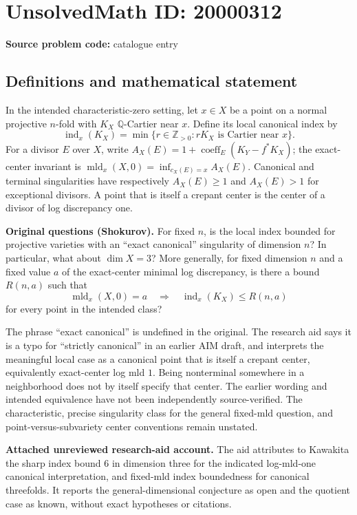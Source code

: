 \documentclass[11pt]{article}
\newcommand{\Z}{\mathbb{Z}}
\newcommand{\Q}{\mathbb{Q}}
\begin{document}
\section*{UnsolvedMath ID: 20000312}
\textbf{Source problem code:} catalogue entry
\subsection{Definitions and mathematical statement}
In the intended characteristic-zero setting, let $x\in X$ be a point on a normal projective $n$-fold with $K_X$ $\Q$-Cartier near $x$. Define its local canonical index by
\[\operatorname{ind}_x(K_X)=\min\{r\in\Z_{>0}:rK_X\text{ is Cartier near }x\}.\]
For a divisor $E$ over $X$, write $A_X(E)=1+\operatorname{coeff}_E(K_Y-f^*K_X)$; the exact-center invariant is $\operatorname{mld}_x(X,0)=\inf_{c_X(E)=x}A_X(E)$. Canonical and terminal singularities have respectively $A_X(E)\ge1$ and $A_X(E)>1$ for exceptional divisors. A point that is itself a crepant center is the center of a divisor of log discrepancy one.

\textbf{Original questions (Shokurov).} For fixed $n$, is the local index bounded for projective varieties with an ``exact canonical'' singularity of dimension $n$? In particular, what about $\dim X=3$? More generally, for fixed dimension $n$ and a fixed value $a$ of the exact-center minimal log discrepancy, is there a bound $R(n,a)$ such that
\[\operatorname{mld}_x(X,0)=a\quad\Longrightarrow\quad\operatorname{ind}_x(K_X)\le R(n,a)\]
for every point in the intended class?

The phrase ``exact canonical'' is undefined in the original. The research aid says it is a typo for ``strictly canonical'' in an earlier AIM draft, and interprets the meaningful local case as a canonical point that is itself a crepant center, equivalently exact-center log mld $1$. Being nonterminal somewhere in a neighborhood does not by itself specify that center. The earlier wording and intended equivalence have not been independently source-verified. The characteristic, precise singularity class for the general fixed-mld question, and point-versus-subvariety center conventions remain unstated.

\textbf{Attached unreviewed research-aid account.} The aid attributes to Kawakita the sharp index bound $6$ in dimension three for the indicated log-mld-one canonical interpretation, and fixed-mld index boundedness for canonical threefolds. It reports the general-dimensional conjecture as open and the quotient case as known, without exact hypotheses or citations.
\end{document}
